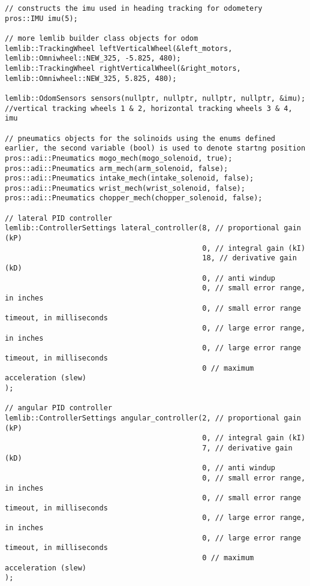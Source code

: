 \begin{verbatim}
// constructs the imu used in heading tracking for odometery
pros::IMU imu(5);

// more lemlib builder class objects for odom
lemlib::TrackingWheel leftVerticalWheel(&left_motors, lemlib::Omniwheel::NEW_325, -5.825, 480);
lemlib::TrackingWheel rightVerticalWheel(&right_motors, lemlib::Omniwheel::NEW_325, 5.825, 480);

lemlib::OdomSensors sensors(nullptr, nullptr, nullptr, nullptr, &imu); //vertical tracking wheels 1 & 2, horizontal tracking wheels 3 & 4, imu

// pneumatics objects for the solinoids using the enums defined earlier, the second variable (bool) is used to denote startng position
pros::adi::Pneumatics mogo_mech(mogo_solenoid, true);
pros::adi::Pneumatics arm_mech(arm_solenoid, false);
pros::adi::Pneumatics intake_mech(intake_solenoid, false);
pros::adi::Pneumatics wrist_mech(wrist_solenoid, false);
pros::adi::Pneumatics chopper_mech(chopper_solenoid, false);

// lateral PID controller
lemlib::ControllerSettings lateral_controller(8, // proportional gain (kP)
                                              0, // integral gain (kI)
                                              18, // derivative gain (kD)
                                              0, // anti windup
                                              0, // small error range, in inches
                                              0, // small error range timeout, in milliseconds
                                              0, // large error range, in inches
                                              0, // large error range timeout, in milliseconds
                                              0 // maximum acceleration (slew)
);

// angular PID controller
lemlib::ControllerSettings angular_controller(2, // proportional gain (kP)
                                              0, // integral gain (kI)
                                              7, // derivative gain (kD)
                                              0, // anti windup
                                              0, // small error range, in inches
                                              0, // small error range timeout, in milliseconds
                                              0, // large error range, in inches
                                              0, // large error range timeout, in milliseconds
                                              0 // maximum acceleration (slew)
);


\end{verbatim}
